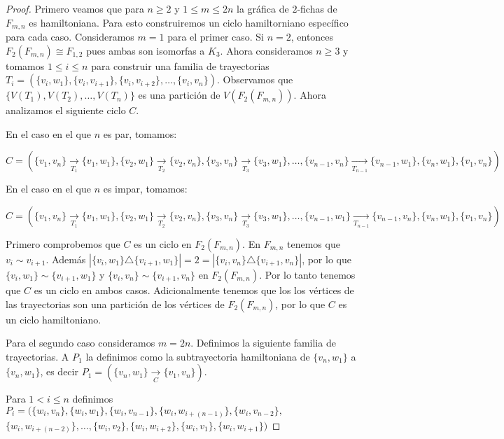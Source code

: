 \begin{proof}
    Primero veamos que para $n \geq 2$ y $1 \leq m \leq 2n$ la gr\'afica de
    $2$-fichas de $F_{m,n}$ es hamiltoniana. Para esto construiremos un ciclo
    hamiltorniano espec\'ifico para cada caso. Consideramos $m=1$ para el primer
    caso. Si $n=2$, entonces $F_2(F_{m,n}) \cong F_{1,2}$ pues ambas son
    isomorfas a $K_3$. Ahora consideramos $n \geq 3$ y tomamos $1 \leq i \leq n$
    para construir una familia de trayectorias
    $T_i=(\{v_i,w_1\},\{v_i,v_{i+1}\},\{v_i,v_{i+2}\},\dots, \{v_i,v_n\})$. Observamos
    que $\{V(T_1),V(T_2),\dots, V(T_n)\}$ es una partici\'on de
    $V(F_2(F_{m,n}))$. %
    Ahora analizamos el siguiente ciclo $C$.
    
    En el caso en el que $n$ es par, tomamos:

    $C=(\{v_1,v_n\} \xrightarrow[T_1]{}\{v_1,w_1\},\{v_2,w_1\}
    \xrightarrow[T_2]{}\{v_2,v_n\},\{v_3,v_n\} \xrightarrow[T_3]{}\{v_3,w_1\},
    \dots, \{v_{n-1},v_n\}
    \xrightarrow[T_{n-1}]{}\{v_{n-1},w_1\},\{v_n,w_1\},\{v_1,v_n\})$

    En el caso en el que $n$ es impar, tomamos:

    $C=(\{v_1,v_n\} \xrightarrow[T_1]{}\{v_1,w_1\},\{v_2,w_1\}
    \xrightarrow[T_2]{}\{v_2,v_n\},\{v_3,v_n\} \xrightarrow[T_3]{}\{v_3,w_1\},
    \dots, \{v_{n-1},w_1\}
    \xrightarrow[T_{n-1}]{}\{v_{n-1},v_n\},\{v_n,w_1\},\{v_1,v_n\})$

    Primero comprobemos que $C$ es un ciclo en $F_2(F_{m,n})$. En $F_{m,n}$
    tenemos que $v_i \sim v_{i+1}$. Adem\'as $|\{v_i,w_1\}\triangle
    \{v_{i+1},w_1\}|=2 =|\{v_i,v_n\}\triangle \{v_{i+1},v_n\}|$, por lo que
    $\{v_i,w_1\}\sim \{v_{i+1},w_1\}$ y $\{v_i,v_n\}\sim \{v_{i+1},v_n\}$ en
    $F_2(F_{m,n})$. Por lo tanto tenemos que $C$ es un ciclo en ambos casos.
    Adicionalmente tenemos que los los v\'ertices de las trayectorias son una
    partici\'on de los v\'ertices de $F_2(F_{m,n})$, por lo que $C$ es un ciclo
    hamiltoniano.

    Para el segundo caso consideramos $m=2n$. Definimos la siguiente familia de
    trayectorias. A $P_1$ la definimos como la subtrayectoria hamiltoniana de
    $\{v_n,w_1\}$ a $\{v_n,w_1\}$, es decir $P_1= (\{v_n,w_1\}
    \xrightarrow[C]{}\{v_1,v_n\})$. 
    
    Para $1 < i \leq n$ definimos
    $P_i=(\{w_i,v_n\},\{w_i,w_1\},\{w_i,v_{n-1}\},\{w_i,w_{i+(n-1)}\},\{w_i,v_{n-2}\},$
    $\{w_i,w_{i+(n-2)}\},\dots,\{w_i,v_2\},\{w_i,w_{i+2}\},\{w_i,v_1\},\{w_i,w_{i+1}\})$


\end{proof}
